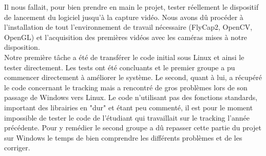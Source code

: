 Il nous fallait, pour bien prendre en main le projet, tester réellement le dispositif de lancement du logiciel jusqu'à la capture vidéo. Nous avons dû  procéder à l'installation de tout l'environnement de travail nécessaire (FlyCap2, OpenCV, OpenGL) et l’acquisition des premières vidéos avec les caméras mises à notre disposition. \\

Notre première tâche a été de transférer le code initial sous Linux et ainsi le tester directement. Les tests ont été concluants et le premier groupe a pu commencer directement à améliorer le système. Le second, quant à lui, a récupéré le code concernant le tracking mais a rencontré de gros problèmes lors de son passage de Windows vers Linux.
Le code n'utilisant pas des fonctions standards, important des librairies en "dur" et étant peu commenté, il est pour le moment impossible de tester le code de l'étudiant qui travaillait sur le tracking l'année précédente. Pour y remédier le second groupe a dû repasser cette partie du projet sur Windows le temps de bien comprendre les différents problèmes et de les corriger.